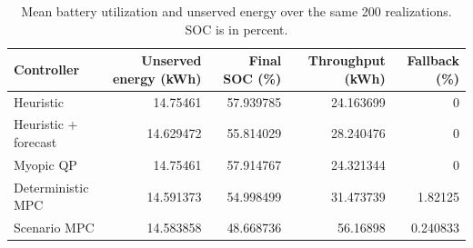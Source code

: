 \begin{table}[t]
\centering
\small
\caption{Mean battery utilization and unserved energy over the same 200 realizations. SOC is in percent.}
\begin{tabular}{lrrrr}
\hline
Controller & Unserved energy (kWh) & Final SOC (\%) & Throughput (kWh) & Fallback (\%) \\
\hline
Heuristic & 14.75461 & 57.939785 & 24.163699 & 0 \\
Heuristic + forecast & 14.629472 & 55.814029 & 28.240476 & 0 \\
Myopic QP & 14.75461 & 57.914767 & 24.321344 & 0 \\
Deterministic MPC & 14.591373 & 54.998499 & 31.473739 & 1.82125 \\
Scenario MPC & 14.583858 & 48.668736 & 56.16898 & 0.240833 \\
\hline
\end{tabular}
\end{table}
